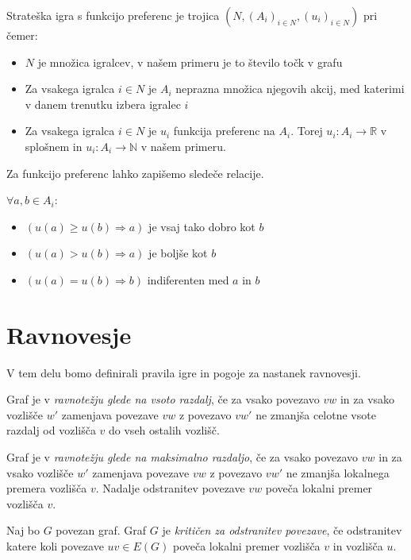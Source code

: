 \documentclass[fin1, tisk]{fmfdelo}
\begin{document}
\begin{definicija}
    Strateška igra s funkcijo preferenc je trojica $(N, (A_i)_{i\in N} , (u_i)_{i\in N})$ pri čemer:
\begin{itemize}
    \item $N$ je množica igralcev, v našem primeru je to število točk v grafu
    \item Za vsakega igralca $i \in N$ je $A_i$ neprazna množica njegovih akcij, med katerimi v danem trenutku izbera igralec $i$
    \item Za vsakega igralca $i \in N$ je $u_i$ funkcija preferenc na $A_i$. Torej $u_i : A_i \to \mathbb{R}$ v splošnem in $u_i : A_i \to \mathbb{N}$ v našem primeru.
\end{itemize}
\end{definicija}
Za funkcijo preferenc lahko zapišemo sledeče relacije.

$\forall a,b \in A_i:$
\begin{itemize}
    \item $(u(a) \geq u(b) \Rightarrow a)$ je vsaj tako dobro kot $b$
    \item $(u(a) > u(b) \Rightarrow a)$ je boljše kot $b$
    \item $(u(a) = u(b) \Rightarrow b)$ indiferenten med $a$ in $b$
\end{itemize}


\section{Ravnovesje}
V tem delu bomo definirali pravila igre in pogoje za nastanek ravnovesji.

\begin{definicija}
Graf je v \textit{ravnotežju glede na vsoto razdalj}, če za vsako povezavo $vw$ in
za vsako vozlišče $w'$ zamenjava povezave $vw$ z povezavo $vw'$ ne zmanjša
celotne vsote razdalj od vozlišča $v$ do vseh ostalih vozlišč.
\end{definicija}

\begin{definicija}
Graf je v \textit{ravnotežju glede na maksimalno razdaljo}, če za vsako povezavo $vw$
in za vsako vozlišče $w'$ zamenjava povezave $vw$ z povezavo $vw'$ ne zmanjša
lokalnega premera vozlišča $v$. Nadalje odstranitev povezave $vw$ poveča
lokalni premer vozlišča $v$.
\end{definicija}


\begin{definicija}
Naj bo $G$ povezan graf. Graf $G$ je \textit{kritičen za odstranitev povezave},
če odstranitev katere koli povezave $uv \in E(G)$ poveča lokalni premer vozlišča $v$ in vozlišča $u$.
\end{definicija}
\end{document}
